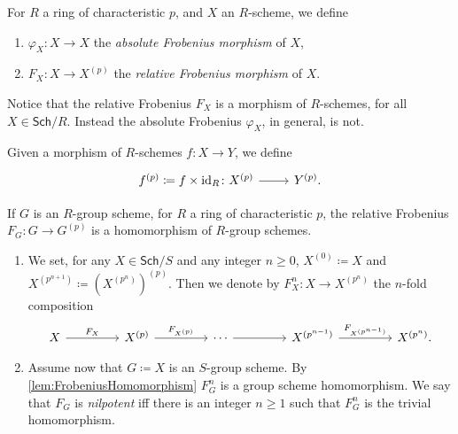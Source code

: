 \begin{defn}
	For $R$ a ring of characteristic $p$, and $X$ an $R$-scheme, we define
\begin{enumerate}
	\item $\varphi_X\colon X \to X$ the \emph{absolute Frobenius morphism} of $X$,
	\item $F_X \colon X \to X^{(p)}$ the \emph{relative Frobenius morphism} of $X$.
\end{enumerate}
\end{defn}


\begin{rem}[]
	Notice that the relative Frobenius $F_X$ is a
	morphism of $R$-schemes, for all $X \in \mathsf{Sch}/R$.
	Instead the absolute Frobenius $\varphi_X$, in general, is not.
\end{rem}


\begin{ntt}
	Given a morphism of $R$-schemes $f\colon X \to Y$,
	we define 
	\begin{equation*}
	\begin{tikzcd}[row sep = 0ex
		,/tikz/column 1/.append style={anchor=base east}
		,/tikz/column 2/.append style={anchor=base west}]
		f^{(p)} \coloneqq f \times \id_{ R }\colon 
		X^{(p)} \arrow[r, "", rightarrow] &
		Y^{(p)}
	.\end{tikzcd}
	\end{equation*}
\end{ntt}


\begin{lem}\label{lem:FrobeniusHomomorphism}
	If $G$ is an $R$-group scheme, for $R$ a ring of characteristic $p$,
	the relative Frobenius $F_G\colon G \to G^{(p)}$ is a 
	homomorphism of $R$-group schemes.
\end{lem} 


\begin{defn}\leavevmode\vspace{-1.2\baselineskip}\label{defn:nilpotentFrobenius}
\begin{enumerate}
\item We set, for any $X \in \mathsf{Sch}/S$ and any integer $n \geq 0$,
	$X^{(0)} \coloneqq X$ and $X^{(p^{n+1})} \coloneqq \left( X^{(p^{n})} \right)^{(p)}$.
	Then we denote by $F^n_X\colon X \to X^{(p^n)}$
	the $n$-fold composition
	\begin{equation*}
	\begin{tikzcd}[column sep=4.3em]
		X \arrow[r, "F_X", rightarrow] &
		X^{(p)} \arrow[r, "F_{X^{(p)}}", rightarrow] &
		\cdots \arrow[r, "", rightarrow] &
		X^{(p^{n-1})} \arrow[r, "F_{X^{(p^{n-1})}}", rightarrow] &
		X^{(p^n)}
	.\end{tikzcd}
	\end{equation*}
\item Assume now that $G \coloneqq X$ is an $S$-group scheme. 
	By \cref{lem:FrobeniusHomomorphism} $F^n_G$ is a group scheme homomorphism.
	We say that $F_G$ is \emph{nilpotent} iff there is an integer $n \geq 1$ such that
	$F^n_G$ is the trivial homomorphism.
\end{enumerate}
\end{defn}


